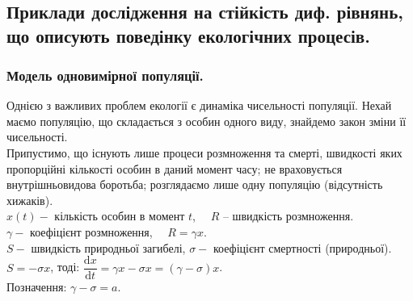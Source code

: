 \documentclass[14pt,a4paper]{scrartcl}
\theoremstyle{definition}
\theoremstyle{definition}
\theoremstyle{definition}
\begin{document}
\section{}
\subsection{Приклади дослідження на стійкість диф. рівнянь, що описують поведінку екологічних процесів.}

\subsubsection{Модель одновимірної популяції.}
Однією з важливих проблем екології є динаміка чисельності популяції. Нехай маємо популяцію, що складається з особин одного виду, знайдемо закон зміни її чисельності. \\

Припустимо, що існують лише процеси розмноження та смерті, швидкості яких пропорційні кількості особин в даний момент часу; не враховується внутрішньовидова боротьба; розглядаємо лише одну популяцію (відсутність хижаків). \\

$x(t) - $ кількість особин в момент $t$, $\quad R$ -- швидкість розмноження. \\
$\gamma - $ коефіцієнт розмноження, $\quad R = \gamma x $.\\
$ S - $ швидкість природньої загибелі, $\sigma - $ коефіцієнт смертності (природньої).\\
$S = - \sigma x$, тоді: $ \dfrac{\mathrm{d}x}{\mathrm{d}t} = \gamma x - \sigma x = (\gamma - \sigma)x $.\\

Позначення: $ \gamma - \sigma = a$.
\end{document}
